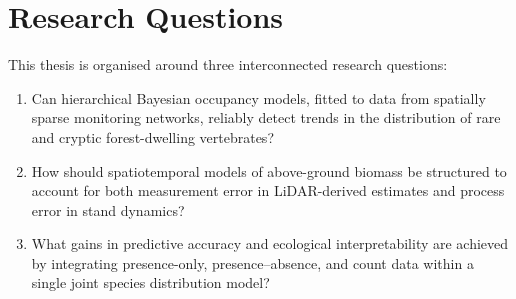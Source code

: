 \section{Research Questions}

This thesis is organised around three interconnected research questions:

\begin{enumerate}[label=\textbf{RQ\arabic*:}, leftmargin=*, itemsep=6pt]
  \item Can hierarchical Bayesian occupancy models, fitted to data from
        spatially sparse monitoring networks, reliably detect trends in the
        distribution of rare and cryptic forest-dwelling vertebrates?
  \item How should spatiotemporal models of above-ground biomass be structured
        to account for both measurement error in LiDAR-derived estimates and
        process error in stand dynamics?
  \item What gains in predictive accuracy and ecological interpretability are
        achieved by integrating presence-only, presence--absence, and count data
        within a single joint species distribution model?
\end{enumerate}
